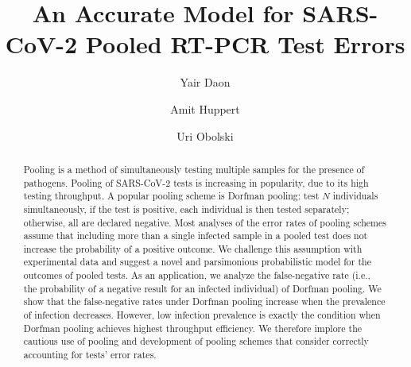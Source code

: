 \documentclass{article}
\begin{document}
\title{An Accurate Model for SARS-CoV-2 Pooled RT-PCR Test Errors}

\author[1,2]{Yair Daon}
\author[1,3,*]{Amit Huppert}
\author[1,2,*]{Uri Obolski}



\date{}

\maketitle

\begin{abstract}
Pooling is a method of simultaneously testing multiple samples for the
presence of pathogens. Pooling of SARS-CoV-2 tests is increasing in
popularity, due to its high testing throughput. A popular pooling
scheme is Dorfman pooling: test $N$ individuals simultaneously, if the
test is positive, each individual is then tested separately;
otherwise, all are declared negative. Most analyses of the error rates
of pooling schemes assume that including more than a single infected
sample in a pooled test does not increase the probability of a
positive outcome. We challenge this assumption with experimental data
and suggest a novel and parsimonious probabilistic model for the
outcomes of pooled tests. As an application, we analyze the
false-negative rate (i.e., the probability of a negative result for an
infected individual) of Dorfman pooling. We show that the
false-negative rates under Dorfman pooling increase when the
prevalence of infection decreases. However, low infection prevalence
is exactly the condition when Dorfman pooling achieves highest
throughput efficiency. We therefore implore the cautious use of
pooling and development of pooling schemes that consider correctly
accounting for tests' error rates.
\end{abstract}
\newpage
\end{document}
